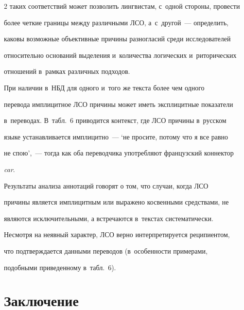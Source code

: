 \begin{multicols}{2}
таких соответствий может позволить лингвистам, с~одной стороны, провести 


более четкие границы между различными ЛСО, а~с~другой~--- определить, 


каковы возможные объективные причины разногласий среди исследователей 


относительно оснований выделения и~количества логических и~риторических 


отношений в~рамках различных подходов.


   


   При наличии в~НБД для одного и~того же текста более чем одного 


перевода имплицитное ЛСО причины может иметь эксплицитные показатели 


в~переводах. В~табл.~6 приводится контекст, где ЛСО причины в~русском 


языке устанавливается имплицитно~--- `не просите, потому что я все равно 


не спою',~--- тогда как оба переводчика употребляют французский коннектор 


\textit{car}.


   





   


   Результаты анализа аннотаций говорят о том, что случаи, когда ЛСО 


причины является имплицитным или выражено косвенными средствами, не 


являются исключительными, а встречаются в~текстах систематически. 


Несмотря на неявный характер, ЛСО верно интерпретируется реципиентом, 


что подтверждается данными переводов (в~особенности примерами, 


подобными приведенному в~табл.~6).





\vspace*{-11pt}


   


\section{Заключение}






\end{multicols}
